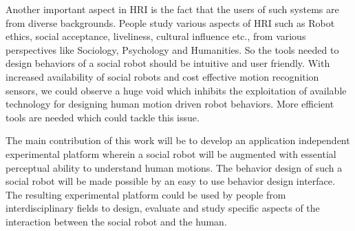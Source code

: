 \documentclass{llncs}
\begin{document}
Another important aspect in HRI is the fact that the users of such systems are from diverse backgrounds. People study various aspects of HRI such as Robot ethics, social acceptance, liveliness, cultural influence etc., from various perspectives like Sociology, Psychology and Humanities. So the tools needed to design behaviors of a social robot should be intuitive and user friendly.  With increased availability of social robots and cost effective motion recognition sensors, we could observe a huge void which inhibits the exploitation of available technology for designing human motion driven robot behaviors. More efficient tools are needed which could tackle this issue.

The main contribution of this work will be to develop an application independent experimental platform wherein a social robot will be augmented with essential perceptual ability to understand human motions. The behavior design of such a social robot will be made possible by an easy to use behavior design interface. The resulting experimental platform could be used by people from interdisciplinary fields to design, evaluate and study specific aspects of the interaction between the social robot and the human.
%
%
\end{document}

